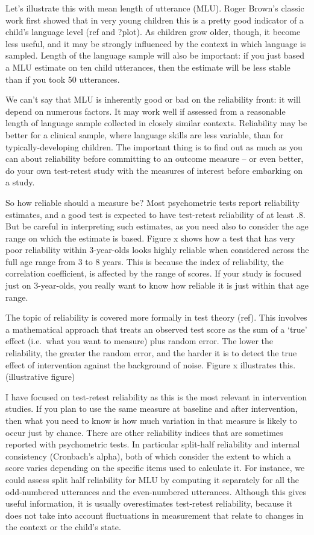 \documentclass[]{book}
\begin{document}
Let's illustrate this with mean length of utterance (MLU). Roger Brown's classic work first showed that in very young children this is a pretty good indicator of a child's language level (ref and ?plot). As children grow older, though, it become less useful, and it may be strongly influenced by the context in which language is sampled. Length of the language sample will also be important: if you just based a MLU estimate on ten child utterances, then the estimate will be less stable than if you took 50 utterances.

We can't say that MLU is inherently good or bad on the reliability front: it will depend on numerous factors. It may work well if assessed from a reasonable length of language sample collected in closely similar contexts. Reliability may be better for a clinical sample, where language skills are less variable, than for typically-developing children. The important thing is to find out as much as you can about reliability before committing to an outcome measure -- or even better, do your own test-retest study with the measures of interest before embarking on a study.

So how reliable should a measure be? Most psychometric tests report reliability estimates, and a good test is expected to have test-retest reliability of at least .8. But be careful in interpreting such estimates, as you need also to consider the age range on which the estimate is based. Figure x shows how a test that has very poor reliability within 3-year-olds looks highly reliable when considered across the full age range from 3 to 8 years. This is because the index of reliability, the correlation coefficient, is affected by the range of scores. If your study is focused just on 3-year-olds, you really want to know how reliable it is just within that age range.

The topic of reliability is covered more formally in test theory (ref). This involves a mathematical approach that treats an observed test score as the sum of a `true' effect (i.e.~what you want to measure) plus random error. The lower the reliability, the greater the random error, and the harder it is to detect the true effect of intervention against the background of noise. Figure x illustrates this.
(illustrative figure)

I have focused on test-retest reliability as this is the most relevant in intervention studies. If you plan to use the same measure at baseline and after intervention, then what you need to know is how much variation in that measure is likely to occur just by chance. There are other reliability indices that are sometimes reported with psychometric tests. In particular split-half reliability and internal consistency (Cronbach's alpha), both of which consider the extent to which a score varies depending on the specific items used to calculate it. For instance, we could assess split half reliability for MLU by computing it separately for all the odd-numbered utterances and the even-numbered utterances. Although this gives useful information, it is usually overestimates test-retest reliability, because it does not take into account fluctuations in measurement that relate to changes in the context or the child's state.
\end{document}
